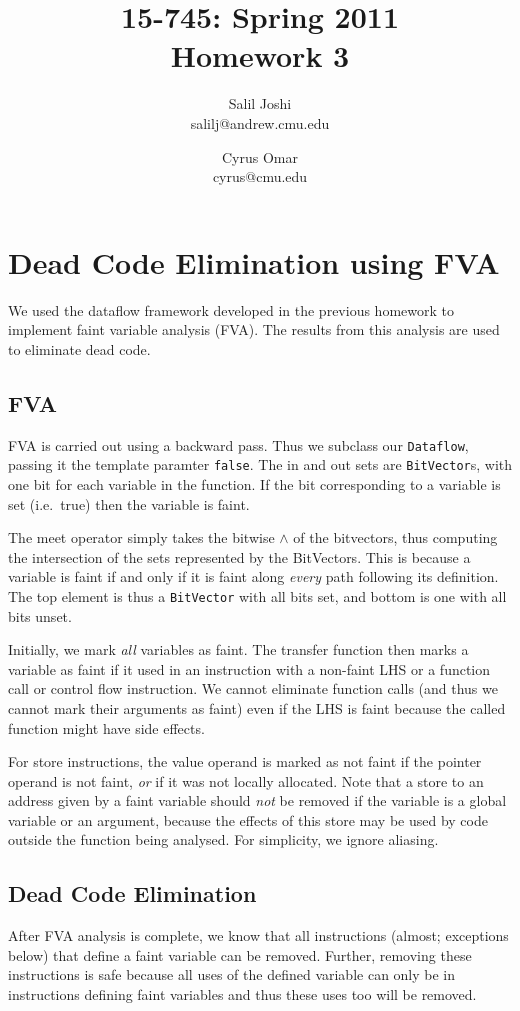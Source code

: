 \documentclass[12pt]{article}
\title{{\small 15-745: Spring 2011}\\Homework 3}
\author{Salil Joshi\\
salilj@andrew.cmu.edu
\and
Cyrus Omar\\
cyrus@cmu.edu
}
\date{}                                           %
\begin{document}
\maketitle
\section{Dead Code Elimination using FVA}
We used the dataflow framework developed in the previous homework to implement faint variable analysis (FVA). The results from this analysis are used to eliminate dead code.

\subsection{FVA}
FVA is carried out using a backward pass. Thus we subclass our \verb|Dataflow|, passing it the template paramter \verb|false|. The in and out sets are \verb|BitVector|s, with one bit for each variable in the function. If the bit corresponding to a variable is set (i.e.\ true) then the variable is faint.

The meet operator simply takes the bitwise $\land$ of the bitvectors, thus computing the intersection of the sets represented by the BitVectors. This is because a variable is faint if and only if it is faint along \emph{every} path following its definition. The top element is thus a \verb|BitVector| with all bits set, and bottom is one with all bits unset.

Initially, we mark \emph{all} variables as faint. The transfer function then marks a variable as faint if it used in an instruction with a non-faint LHS or a function call or control flow instruction. We cannot eliminate function calls (and thus we cannot mark their arguments as faint) even if the LHS is faint because the called function might have side effects.

For store instructions, the value operand is marked as not faint if the pointer operand is not faint, \emph{or} if it was not locally allocated. Note that a store to an address given by a faint variable should \emph{not} be removed if the variable is a global variable or an argument, because the effects of this store may be used by code outside the function being analysed. For simplicity, we ignore aliasing.


\subsection{Dead Code Elimination}
After FVA analysis is complete, we know that all instructions (almost; exceptions below) that define a faint variable can be removed. Further, removing these instructions is safe because all uses of the defined variable can only be in instructions defining faint variables and thus these uses too will be removed.
\end{document}
